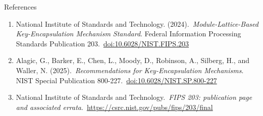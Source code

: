 \documentclass[aspectratio=169,11pt]{beamer}
\begin{document}
\begin{frame}{References}
  \small
  \begin{enumerate}
    \setlength{\itemsep}{0.85em}
    \item National Institute of Standards and Technology. (2024).\
      \textit{Module-Lattice-Based Key-Encapsulation Mechanism Standard}. Federal Information Processing Standards Publication 203.\
      \href{https://doi.org/10.6028/NIST.FIPS.203}{doi:10.6028/NIST.FIPS.203}
    \item Alagic, G., Barker, E., Chen, L., Moody, D., Robinson, A., Silberg, H., and Waller, N. (2025).\
      \textit{Recommendations for Key-Encapsulation Mechanisms}. NIST Special Publication 800-227.\
      \href{https://doi.org/10.6028/NIST.SP.800-227}{doi:10.6028/NIST.SP.800-227}
    \item National Institute of Standards and Technology.\
      \textit{FIPS 203: publication page and associated errata}.\
      \href{https://csrc.nist.gov/pubs/fips/203/final}{https://csrc.nist.gov/pubs/fips/203/final}
  \end{enumerate}
\end{frame}
\end{document}
